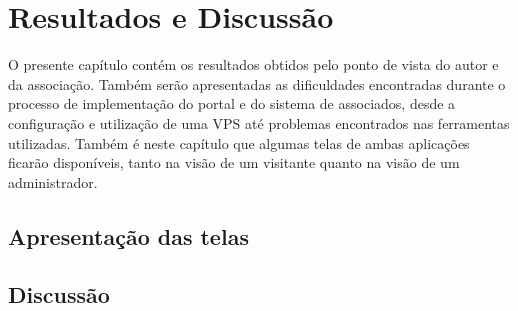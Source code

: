 \chapter{Resultados e Discussão}

O presente capítulo contém os resultados obtidos pelo ponto de vista do autor e da associação. Também serão apresentadas as dificuldades encontradas durante o processo de implementação do portal e do sistema de associados, desde a configuração e utilização de uma VPS até problemas encontrados nas ferramentas utilizadas. Também é neste capítulo que algumas telas de ambas aplicações ficarão disponíveis, tanto na visão de um visitante quanto na visão de um administrador.

\hspace{2.5cm}
\section{Apresentação das telas}
\label{subsec:telas}
\hspace{2.5cm}

\hspace{2.5cm}
\section{Discussão}
\label{subsec:telas}
\hspace{2.5cm}



